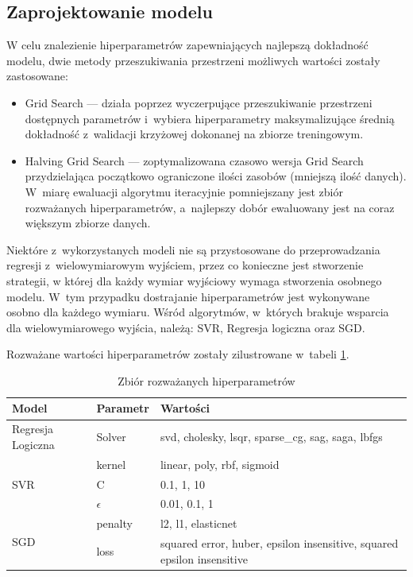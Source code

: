 \subsection{Zaprojektowanie modelu}

W celu znalezienie hiperparametrów zapewniających najlepszą dokładność modelu,
dwie metody przeszukiwania przestrzeni możliwych wartości zostały zastosowane:

\begin{itemize}
    \item Grid Search — działa poprzez wyczerpujące przeszukiwanie 
    przestrzeni dostępnych parametrów i~wybiera hiperparametry maksymalizujące
    średnią dokładność z~walidacji krzyżowej dokonanej na zbiorze treningowym.
    \item Halving Grid Search — zoptymalizowana czasowo wersja Grid Search
    przydzielająca początkowo ograniczone ilości zasobów (mniejszą ilość
    danych). W~miarę ewaluacji algorytmu iteracyjnie pomniejszany jest zbiór
    rozważanych hiperparametrów, a~najlepszy dobór ewaluowany jest na coraz większym
    zbiorze danych.
\end{itemize}

Niektóre z~wykorzystanych modeli nie są przystosowane do przeprowadzania 
regresji z~wielowymiarowym wyjściem, przez co konieczne jest stworzenie strategii,
w której dla każdy wymiar wyjściowy wymaga stworzenia osobnego modelu. W~tym przypadku
dostrajanie hiperparametrów jest wykonywane osobno dla każdego wymiaru. Wśród
algorytmów, w~których brakuje wsparcia dla wielowymiarowego wyjścia, należą: 
SVR, Regresja logiczna oraz SGD.

Rozważane wartości hiperparametrów zostały zilustrowane w~tabeli \ref{hiperparametry}.

\begin{table}[H]
    \centering
    \caption{Zbiór rozważanych hiperparametrów} \label{hiperparametry}
    \bigskip
    \begin{tabular}{|p{4cm}|p{4cm}|p{4cm}|}
    \hline
    Model & Parametr & Wartości \\
    \hline
    Regresja Logiczna & Solver & svd, cholesky, lsqr, sparse\_cg, sag, saga, lbfgs \\
    \hline
    \multirow{3}{*}{SVR} & kernel & linear, poly, rbf, sigmoid\\
    \cline{2-3}
     & C & 0.1, 1, 10\\
    \cline{2-3}
        & $\epsilon$ & 0.01, 0.1, 1\\
    \hline
    \multirow{3}{*}{SGD} & penalty & l2, l1, elasticnet\\
    \cline{2-3}
     & loss & squared error, huber, epsilon insensitive, squared epsilon insensitive\\
    \hline
\end{tabular}
\end{table}

